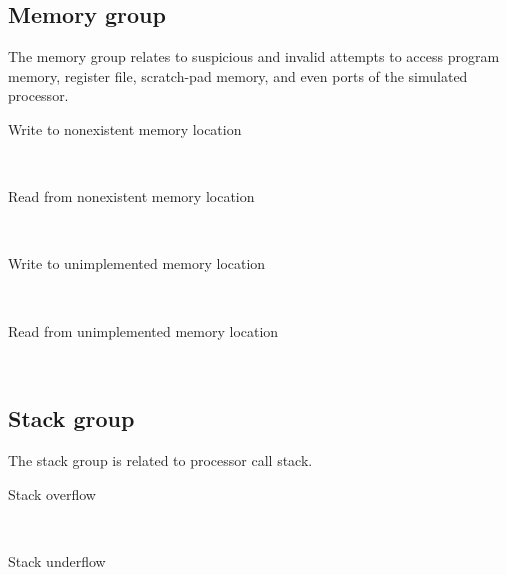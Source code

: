    \subsection{Memory group}
        The memory group relates to suspicious and invalid attempts to access program memory, register file, scratch-pad memory, and even ports of the simulated processor.
        \begin{description}
            \item[Write to nonexistent memory location]~\\ %
            \item[Read from nonexistent memory location]~\\ %
            \item[Write to unimplemented memory location]~\\ %
            \item[Read from unimplemented memory location]~\\ %
        \end{description}

    \subsection{Stack group}
        The stack group is related to processor call stack.
        \begin{description}
            \item[Stack overflow]~\\ %
            \item[Stack underflow]~\\ %
        \end{description}

